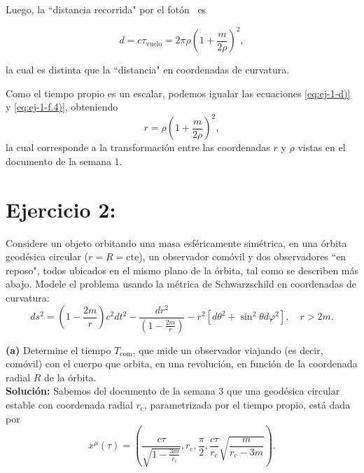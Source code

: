 \documentclass[letterpaper,11pt]{article}
\begin{document}
Luego, la ``distancia recorrida" por el fotón \ es
\begin{shaded}
\begin{equation}
d = c \tau_{\text{vuelo}} = 2\pi \rho \left(1 + \frac{m}{2\rho}\right)^2, \label{eq:ej-1-f.5)}
\end{equation}
\end{shaded}
la cual es distinta que la ``distancia" en coordenadas de curvatura.

Como el tiempo propio es un escalar, podemos igualar las ecuaciones \eqref{eq:ej-1-d)} y \eqref{eq:ej-1-f.4)}, obteniendo 
\begin{equation}
r = \rho \left(1 + \frac{m}{2\rho}\right)^2,
\end{equation}
la cual corresponde a la transformación entre las coordenadas $r$ y $\rho$ vistas en el documento de la semana 1.

\section*{Ejercicio 2:}

Considere un objeto orbitando una masa esféricamente simétrica, en una órbita geodésica circular ($r = R = \text{cte}$), un observador comóvil y dos observadores ``en reposo", todos ubicados en el mismo plano de la órbita, tal como se describen más abajo. Modele el problema usando la métrica de Schwarzschild en coordenadas de curvatura:
\begin{equation}
ds^2 = \left( 1 - \frac{2m}{r}\right) c^2dt^2 - \frac{dr^2}{\left( 1 - \frac{2m}{r} \right)} - r^2 [d\theta^2 + \sin^2\theta d\varphi^2], \quad r > 2m. \label{eq:Schwarzschild-metric}
\end{equation}


\textbf{(a)} Determine el tiempo $T_{\text{com}}$, que mide un observador viajando (es decir, comóvil) con el cuerpo que orbita, en una revolución, en función de la coordenada radial $R$ de la órbita.
\\

\textbf{Solución:} Sabemos del documento de la semana 3 que una geodésica circular estable con coordenada radial $r_{\text{c}}$, parametrizada por el tiempo propio, está dada por
\begin{equation}
x^{\mu}(\tau) = \left(\frac{c\tau}{\sqrt{1 - \frac{3m}{r_{\text{c}}}}}, r_{\text{c}}, \frac{\pi}{2}, \frac{c\tau}{r_{\text{c}}} \sqrt{\frac{m}{r_{\text{c}} - 3m}} \right). \label{eq:coord-obs1}
\end{equation}
\end{document}
